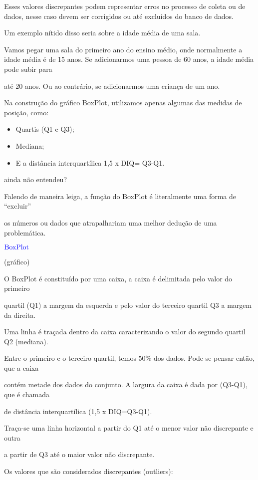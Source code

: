 \documentclass[]{book}
\begin{document}
Esses valores discrepantes podem representar erros no processo de coleta ou de
dados, nesse caso devem ser corrigidos ou até excluídos do banco de dados.

Um exemplo nítido disso seria sobre a idade média de uma sala.

Vamos pegar uma sala do primeiro ano do ensino médio, onde normalmente a idade
média é de 15 anos. Se adicionarmos uma pessoa de 60 anos, a idade média pode subir para

até 20 anos. Ou ao contrário, se adicionarmos uma criança de um ano.

Na construção do gráfico BoxPlot, utilizamos apenas algumas das medidas de posição, como:

\begin{itemize}
\item
  Quartis (Q1 e Q3);
\item
  Mediana;
\item
  E a distância interquartílica 1,5 x DIQ= Q3-Q1.
\end{itemize}

ainda não entendeu?

Falendo de maneira leiga, a função do BoxPlot é literalmente uma forma de ``excluir''

os números ou dados que atrapalhariam uma melhor dedução de uma problemática.

\(\color{blue}{\text{BoxPlot}}\)

(gráfico)

O BoxPlot é constituído por uma caixa, a caixa é delimitada pelo valor do primeiro

quartil (Q1) a margem da esquerda e pelo valor do terceiro quartil Q3 a margem da direita.

Uma linha é traçada dentro da caixa caracterizando o valor do segundo quartil Q2 (mediana).

Entre o primeiro e o terceiro quartil, temos 50\% dos dados. Pode-se pensar então, que a caixa

contém metade dos dados do conjunto. A largura da caixa é dada por (Q3-Q1), que é chamada

de distância interquartílica (1,5 x DIQ=Q3-Q1).

Traça-se uma linha horizontal a partir do Q1 até o menor valor não discrepante e outra

a partir de Q3 até o maior valor não discrepante.

Os valores que são considerados discrepantes (outliers):
\end{document}
